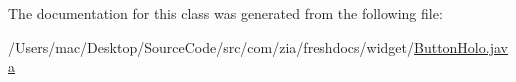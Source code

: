 The documentation for this class was generated from the following file\-:\begin{DoxyCompactItemize}
\item 
/\-Users/mac/\-Desktop/\-Source\-Code/src/com/zia/freshdocs/widget/\hyperlink{_button_holo_8java}{Button\-Holo.\-java}\end{DoxyCompactItemize}
